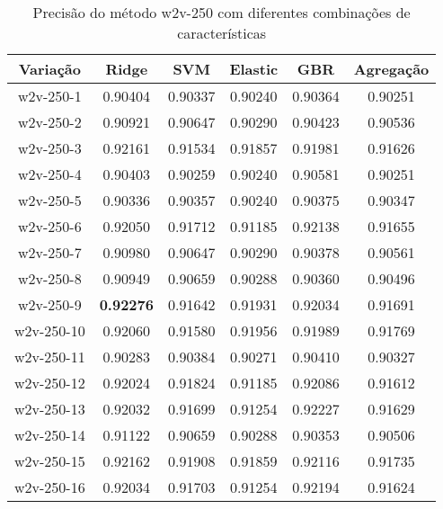 \begin{table}[H]
\label{tab:precisionw2v250}
\centering
\begin{tabular}{|c| c c  c  c  c| }
\hline
Variação &  Ridge & SVM & Elastic & GBR & Agregação  \\ 
\hline
w2v-250-1 & 0.90404 & 0.90337 & 0.90240 & 0.90364 & 0.90251 \\
\hline
w2v-250-2 & 0.90921 & 0.90647 & 0.90290 & 0.90423 & 0.90536 \\
\hline
w2v-250-3 & 0.92161 & 0.91534 & 0.91857 & 0.91981 & 0.91626 \\
\hline
w2v-250-4 & 0.90403 & 0.90259 & 0.90240 & 0.90581 & 0.90251 \\
\hline
w2v-250-5 & 0.90336 & 0.90357 & 0.90240 & 0.90375 & 0.90347 \\
\hline
w2v-250-6 & 0.92050 & 0.91712 & 0.91185 & 0.92138 & 0.91655 \\
\hline
w2v-250-7 & 0.90980 & 0.90647 & 0.90290 & 0.90378 & 0.90561 \\
\hline
w2v-250-8 & 0.90949 & 0.90659 & 0.90288 & 0.90360 & 0.90496 \\
\hline
w2v-250-9 & \textbf{0.92276} & 0.91642 & 0.91931 & 0.92034 & 0.91691 \\
\hline
w2v-250-10 & 0.92060 & 0.91580 & 0.91956 & 0.91989 & 0.91769 \\
\hline
w2v-250-11 & 0.90283 & 0.90384 & 0.90271 & 0.90410 & 0.90327 \\
\hline
w2v-250-12 & 0.92024 & 0.91824 & 0.91185 & 0.92086 & 0.91612 \\
\hline
w2v-250-13 & 0.92032 & 0.91699 & 0.91254 & 0.92227 & 0.91629 \\
\hline
w2v-250-14 & 0.91122 & 0.90659 & 0.90288 & 0.90353 & 0.90506 \\
\hline
w2v-250-15 & 0.92162 & 0.91908 & 0.91859 & 0.92116 & 0.91735 \\
\hline
w2v-250-16 & 0.92034 & 0.91703 & 0.91254 & 0.92194 & 0.91624 \\
\hline
\end{tabular}
\caption{Precisão do método w2v-250 com diferentes combinações de características}
\end{table}

